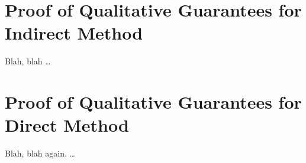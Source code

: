 \chapter{Proof of Qualitative Guarantees for Indirect Method}\label{apps:prf-roubust-direct}

Blah, blah \dots



\chapter{Proof of Qualitative Guarantees for Direct Method}\label{apps:prf-roubust-indirect}

Blah, blah again. \dots

